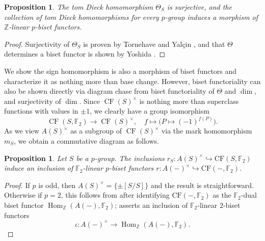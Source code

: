 \documentclass[]{amsart}
\newcommand{\Hom}{\operatorname{Hom}}
\newcommand{\on}[1]{\operatorname{#1}}
\newcommand{\bbF}{\mathbb{F}}
\newcommand{\bbZ}{\mathbb{Z}}
\newtheorem{proposition}[theorem]{Proposition}
\theoremstyle{remark}
\theoremstyle{definition}
\begin{document}
	\begin{proposition}
		The tom Dieck homomorphism $\Theta_S$ is surjective, and the collection of tom Dieck homomorphisms for every $p$-group induces a morphism of $\bbZ$-linear $p$-biset functors. 
	\end{proposition}
	\begin{proof}
		Surjectivity of $\Theta_S$ is proven by Tornehave \cite{Tor84} and Yal\c{c}in \cite{Y05}, and that $\Theta$ determines a biset functor is shown by Yoshida \cite[Lemma 3.5]{Yos90}.
		
	\end{proof}
	
	We show the sign homomorphism is also a morphism of biset functors and characterize it as nothing more than base change. However, biset functoriality can also be shown directly via diagram chase from biset functoriality of $\Theta$ and $\dim$, and surjectivity of $\dim$. 
	Since $\on{CF}(S)^\times$ is nothing more than superclass functions with values in $\pm 1$, we clearly have a group isomorphism 
	\[ \on{CF}(S,\bbF_2) \to \on{CF}(S)^\times, \quad f \mapsto \big(P \mapsto (-1)^{f(P)}\big).\] As we view $A(S)^\times$ as a subgroup of $\on{CF}(S)^\times$ via the mark homomorphism $m_S$, we obtain a commutative diagram as follows. 
	
	\begin{figure}[H]
		\centering
	\end{figure}
	
	\begin{proposition}\label{prop:identification_of_unit_biset}
		Let $S$ be a $p$-group. The inclusions $r_S\colon A(S)^\times \hookrightarrow  \mathrm{CF}(S, \bbF_2)$ induce an inclusion of $\bbF_2$-linear $p$-biset functors $r\colon A(-)^\times \hookrightarrow  \mathrm{CF}(-, \bbF_2)$.
	\end{proposition}
	\begin{proof}
		If $p$ is odd, then $A(S)^\times = \{\pm[S/S]\}$ and the result is straightforward. Otherwise if $p=2$, this follows from \cite[Proposition 11.2.32]{Bou10} after identifying $ \mathrm{CF}(-, \bbF_2)$ as the $\bbF_2$-dual biset functor $\Hom_\bbZ(A(-), \bbF_2)$; \cite[Proposition 11.2.32]{Bou10} asserts an inclusion of $\bbF_2$-linear $2$-biset functors \[\iota\colon A(-)^\times \to \Hom_\bbZ(A(-), \bbF_2).\] 
		
	\end{proof}
	
\end{document}
